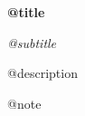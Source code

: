 \hypersetup{pageanchor=false}
\begin{titlepage}
\thispagestyle{empty}
\centering
\vspace*{0.12\textheight}
{\Huge\bfseries @{title}\par}
\vspace{0.7em}
{\Large\itshape @{subtitle}\par}
\vspace{0.7em}
{\large @{description}\par}
\vfill
{\small @{note}\par}
\end{titlepage}
